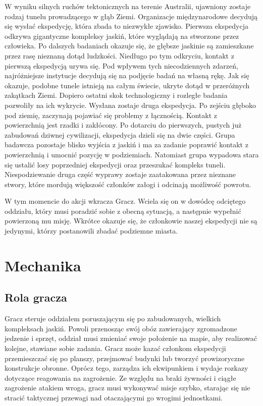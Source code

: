 \documentclass[licencjacka]{pracamgr}
\begin{document}
    W wyniku silnych ruchów tektonicznych na terenie Australii, ujawniony zostaje rodzaj tunelu
    prowadzącego w głąb Ziemi. Organizacje międzynarodowe decydują się wysłać ekspedycję, która zbada to niezwykłe
    zjawisko. Pierwsza ekspedycja odkrywa gigantyczne kompleksy jaskiń, które wyglądają na stworzone przez człowieka.
    Po dalszych badaniach okazuje się, że głębsze jaskinie są zamieszkane przez rasę nieznaną dotąd ludzkości. Niedługo
    po tym odkryciu, kontakt z pierwszą ekspedycją urywa się. Pod wpływem tych niecodziennych zdarzeń, najróżniejsze
    instytucje decydują się na podjęcie badań na własną rękę. Jak się okazuje, podobne tunele istnieją na całym świecie,
    ukryte dotąd w przeróżnych zakątkach Ziemi. Dopiero ostatni skok technologiczny i rozległe badania pozwoliły na ich 
    wykrycie. Wysłana zostaje druga ekspedycja. Po zejściu głęboko pod ziemię, zaczynają pojawiać się problemy z łącznością.
    Kontakt z powierzchnią jest rzadki i zakłócony. Po dotarciu do pierwszych, pustych już zabudowań dziwnej cywilizacji,
    ekspedycja dzieli się na dwie części. Grupa badawcza pozostaje blisko wyjścia z jaskiń i ma za zadanie poprawić
    kontakt z powierzchnią i umocnić pozycję w podziemiach. Natomiast grupa wypadowa stara się ustalić losy poprzedniej
    ekspedycji oraz przeszukać kompleks tuneli. Niespodziewanie druga część wyprawy zostaje zaatakowana przez nieznane stwory,
    które mordują większość członków załogi i odcinają możliwość powrotu.

    W tym momencie do akcji wkracza Gracz. Wciela się on w dowódcę odciętego oddziału, który musi poradzić sobie z obecną
    sytuacją, a następnie wypełnić powierzoną mu misję. Wkrótce okazuje się, że członkowie naszej ekspedycji nie są jedynymi,
    którzy postanowili zbadać podziemne miasta.

  \section{Mechanika}
    \subsection{Rola gracza}
      Gracz steruje oddziałem poruszającym się po zabudowanych, wielkich kompleksach jaskiń. Powoli przenosząc swój obóz zawierający
      zgromadzone jedzenie i sprzęt, oddział musi zmieniać swoje położenie na mapie, aby realizować kolejne, stawiane sobie zadania.
      Gracz może kazać członkom ekspedycji przemieszczać się po planszy, przejmować budynki lub tworzyć prowizoryczne konstrukcje obronne.
      Oprócz tego, zarządza ich ekwipunkiem i wydaje rozkazy dotyczące reagowania na zagrożenie. Ze względu na braki żywności
      i ciągłe zagrożenie atakiem wroga, gracz musi wykonywać misje szybko, starając się nie stracić taktycznej przewagi nad
      otaczającymi go wrogimi jednostkami.
\end{document}
